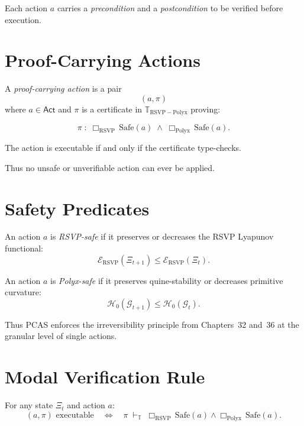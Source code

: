 Each action $a$ carries a \emph{precondition} and a \emph{postcondition} to be
verified before execution.

\section{Proof-Carrying Actions}

\begin{definition}
A \emph{proof-carrying action} is a pair
\[
(a, \pi)
\]
where $a \in \mathsf{Act}$ and $\pi$ is a certificate in
$\mathbb{T}_{\mathrm{RSVP-Polyx}}$ proving:

\[
\pi \;:\;
\Box_{\mathrm{RSVP}}\,\mathrm{Safe}(a)
\;\wedge\;
\Box_{\mathrm{Polyx}}\,\mathrm{Safe}(a).
\]

The action is executable if and only if the certificate type-checks.
\end{definition}

Thus no unsafe or unverifiable action can ever be applied.

\section{Safety Predicates}

\begin{definition}
An action $a$ is \emph{RSVP-safe} if it preserves or decreases the
RSVP Lyapunov functional:
\[
\mathcal{E}_{\mathrm{RSVP}}(\Xi_{t+1})
\le
\mathcal{E}_{\mathrm{RSVP}}(\Xi_t).
\]
\end{definition}

\begin{definition}
An action $a$ is \emph{Polyx-safe} if it preserves quine-stability or
decreases primitive curvature:
\[
\mathcal{H}_0(\mathcal{G}_{t+1})
\le
\mathcal{H}_0(\mathcal{G}_t).
\]
\end{definition}

Thus PCAS enforces the irreversibility principle from Chapters~32 and~36 at the
granular level of single actions.

\section{Modal Verification Rule}

\begin{theorem}
\label{thm:modal-verify}
For any state $\Xi_t$ and action $a$:
\[
(a,\pi) \text{ executable}
\quad\Longleftrightarrow\quad
\pi \;\vdash_{\mathbb{T}} \;
\Box_{\mathrm{RSVP}}\,\mathrm{Safe}(a)
\wedge
\Box_{\mathrm{Polyx}}\,\mathrm{Safe}(a).
\]
\end{theorem}

